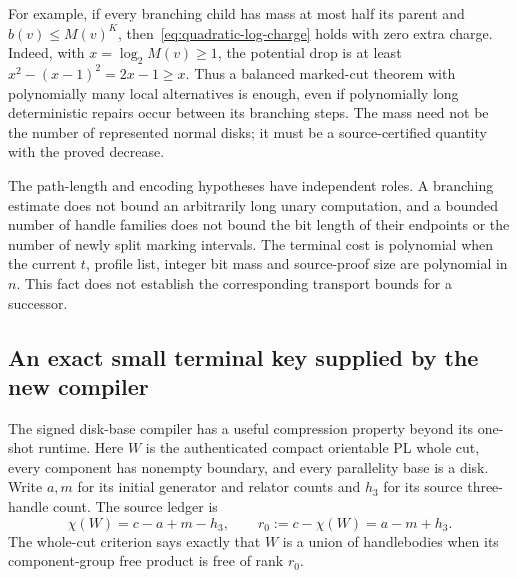 For example, if every branching child has mass at most half its parent
and $b(v)\leq M(v)^K$, then~\eqref{eq:quadratic-log-charge} holds with
zero extra charge.  Indeed, with $x=\log_2 M(v)\geq1$, the potential
drop is at least $x^2-(x-1)^2=2x-1\geq x$.  Thus a balanced
marked-cut theorem with polynomially many local alternatives is enough,
even if polynomially long deterministic repairs occur between its
branching steps.  The mass need not be the number of represented normal
disks; it must be a source-certified quantity with the proved decrease.

The path-length and encoding hypotheses have independent roles.  A
branching estimate does not bound an arbitrarily long unary computation,
and a bounded number of handle families does not bound the bit length of
their endpoints or the number of newly split marking intervals.  The
terminal cost is polynomial when the current $t$, profile list, integer
bit mass and source-proof size are polynomial in $n$.  This fact does
not establish the corresponding transport bounds for a successor.

\subsection{An exact small terminal key supplied by the new compiler}

The signed disk-base compiler has a useful compression property beyond
its one-shot runtime.  Here $W$ is the authenticated compact orientable
PL whole cut, every component has nonempty boundary, and every parallelity
base is a disk.  Write $a,m$ for its initial generator and relator counts
and $h_3$ for its source three-handle count.  The source ledger is
\[
 \chi(W)=c-a+m-h_3,
 \qquad r_0:=c-\chi(W)=a-m+h_3.
\]
The whole-cut criterion says exactly that $W$ is a union of handlebodies
when its component-group free product is free of rank $r_0$.

